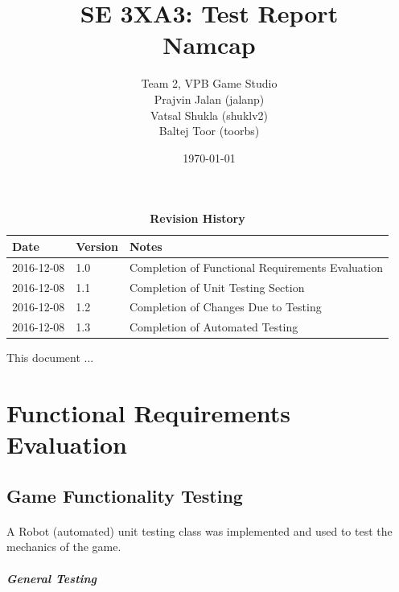 \documentclass[12pt, titlepage]{article}
\title{SE 3XA3: Test Report\\Namcap}
\author{Team 2, VPB Game Studio
		\\ Prajvin Jalan (jalanp)
		\\ Vatsal Shukla (shuklv2)
		\\ Baltej Toor (toorbs)
}
\date{\today}
\begin{document}
\maketitle

\tableofcontents
\listoftables
\listoffigures

\begin{table}[h]
\caption{\bf Revision History}
\begin{tabularx}{\textwidth}{p{3cm}p{2cm}X}
\toprule {\bf Date} & {\bf Version} & {\bf Notes}\\
\midrule
2016-12-08 & 1.0 & Completion of Functional Requirements Evaluation\\
2016-12-08 & 1.1 & Completion of Unit Testing Section\\
2016-12-08 & 1.2 & Completion of Changes Due to Testing\\
2016-12-08 & 1.3 & Completion of Automated Testing\\
\bottomrule
\end{tabularx}
\end{table}

\newpage


This document ...

\section{Functional Requirements Evaluation}

\subsection{Game Functionality Testing}

\paragraph{}
A Robot (automated) unit testing class was implemented and used to test the mechanics of the game.

\subparagraph{General Testing}
\end{document}
